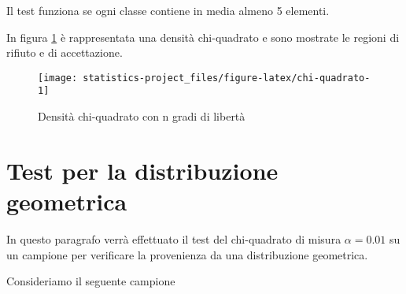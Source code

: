 \documentclass[]{book}
\begin{document}
Il test funziona se ogni classe contiene in media almeno 5 elementi.

In figura \ref{fig:chi-quadrato} è rappresentata una densità
chi-quadrato e sono mostrate le regioni di rifiuto e di accettazione.

\begin{figure}

{\centering \texttt{[image: statistics-project\_files/figure-latex/chi-quadrato-1]} 

}

\caption{Densità chi-quadrato con n gradi di libertà}\label{fig:chi-quadrato}
\end{figure}

\section{Test per la distribuzione
geometrica}\label{test-per-la-distribuzione-geometrica}

In questo paragrafo verrà effettuato il test del chi-quadrato di misura
\(\alpha = 0.01\) su un campione per verificare la provenienza da una
distribuzione geometrica.

Consideriamo il seguente campione
\end{document}
